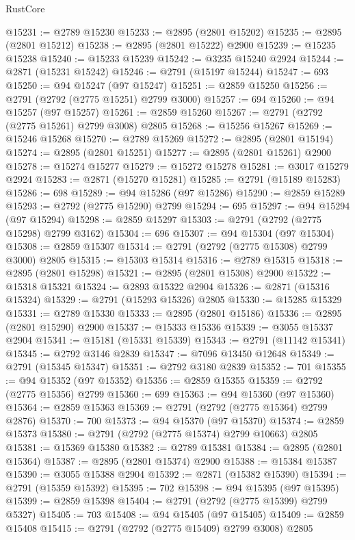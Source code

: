 \begin{lexlean}{RustCore}
\begin{coremodule}
@15231 := @2789 @15230
@15233 := @2895 (@2801 @15202)
@15235 := @2895 (@2801 @15212)
@15238 := @2895 (@2801 @15222) @2900
@15239 := @15235 @15238
@15240 := @15233 @15239
@15242 := @3235 @15240 @2924
@15244 := @2871 (@15231 @15242)
@15246 := @2791 (@15197 @15244)
@15247 := 693
@15250 := @94 @15247 (@97 @15247)
@15251 := @2859 @15250
@15256 := @2791 (@2792 (@2775 @15251) @2799 @3000)
@15257 := 694
@15260 := @94 @15257 (@97 @15257)
@15261 := @2859 @15260
@15267 := @2791 (@2792 (@2775 @15261) @2799 @3008) @2805
@15268 := @15256 @15267
@15269 := @15246 @15268
@15270 := @2789 @15269
@15272 := @2895 (@2801 @15194)
@15274 := @2895 (@2801 @15251)
@15277 := @2895 (@2801 @15261) @2900
@15278 := @15274 @15277
@15279 := @15272 @15278
@15281 := @3017 @15279 @2924
@15283 := @2871 (@15270 @15281)
@15285 := @2791 (@15189 @15283)
@15286 := 698
@15289 := @94 @15286 (@97 @15286)
@15290 := @2859 @15289
@15293 := @2792 (@2775 @15290) @2799
@15294 := 695
@15297 := @94 @15294 (@97 @15294)
@15298 := @2859 @15297
@15303 := @2791 (@2792 (@2775 @15298) @2799 @3162)
@15304 := 696
@15307 := @94 @15304 (@97 @15304)
@15308 := @2859 @15307
@15314 := @2791 (@2792 (@2775 @15308) @2799 @3000) @2805
@15315 := @15303 @15314
@15316 := @2789 @15315
@15318 := @2895 (@2801 @15298)
@15321 := @2895 (@2801 @15308) @2900
@15322 := @15318 @15321
@15324 := @2893 @15322 @2904
@15326 := @2871 (@15316 @15324)
@15329 := @2791 (@15293 @15326) @2805
@15330 := @15285 @15329
@15331 := @2789 @15330
@15333 := @2895 (@2801 @15186)
@15336 := @2895 (@2801 @15290) @2900
@15337 := @15333 @15336
@15339 := @3055 @15337 @2904
@15341 := @15181 (@15331 @15339)
@15343 := @2791 (@11142 @15341)
@15345 := @2792 @3146 @2839
@15347 := @7096 @13450 @12648
@15349 := @2791 (@15345 @15347)
@15351 := @2792 @3180 @2839
@15352 := 701
@15355 := @94 @15352 (@97 @15352)
@15356 := @2859 @15355
@15359 := @2792 (@2775 @15356) @2799
@15360 := 699
@15363 := @94 @15360 (@97 @15360)
@15364 := @2859 @15363
@15369 := @2791 (@2792 (@2775 @15364) @2799 @2876)
@15370 := 700
@15373 := @94 @15370 (@97 @15370)
@15374 := @2859 @15373
@15380 := @2791 (@2792 (@2775 @15374) @2799 @10663) @2805
@15381 := @15369 @15380
@15382 := @2789 @15381
@15384 := @2895 (@2801 @15364)
@15387 := @2895 (@2801 @15374) @2900
@15388 := @15384 @15387
@15390 := @3055 @15388 @2904
@15392 := @2871 (@15382 @15390)
@15394 := @2791 (@15359 @15392)
@15395 := 702
@15398 := @94 @15395 (@97 @15395)
@15399 := @2859 @15398
@15404 := @2791 (@2792 (@2775 @15399) @2799 @5327)
@15405 := 703
@15408 := @94 @15405 (@97 @15405)
@15409 := @2859 @15408
@15415 := @2791 (@2792 (@2775 @15409) @2799 @3008) @2805

\end{coremodule}
\end{lexlean}
